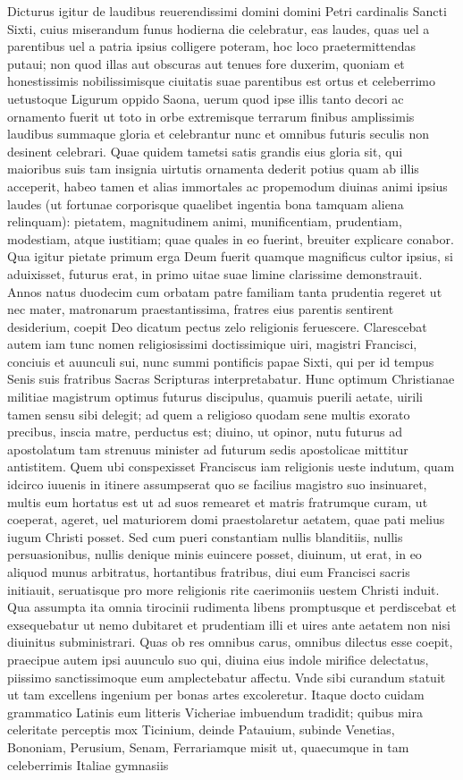 \documentclass[a5paper,twoside]{article}
\begin{document}
Dicturus igitur de laudibus reuerendissimi domini domini Petri cardinalis Sancti Sixti, cuius miserandum funus hodierna die celebratur, eas laudes, quas uel a parentibus uel a patria ipsius colligere poteram, hoc loco praetermittendas putaui; non quod illas aut obscuras aut tenues fore duxerim, quoniam et honestissimis nobilissimisque ciuitatis suae parentibus est ortus et celeberrimo uetustoque Ligurum oppido Saona, uerum quod ipse illis tanto decori ac ornamento fuerit ut toto in orbe extremisque terrarum finibus amplissimis laudibus summaque gloria et celebrantur nunc et omnibus futuris seculis non desinent celebrari. Quae quidem tametsi satis grandis eius gloria sit, qui maioribus suis tam insignia uirtutis ornamenta dederit potius quam ab illis acceperit, habeo tamen et alias immortales ac propemodum diuinas animi ipsius laudes (ut fortunae corporisque quaelibet ingentia bona tamquam aliena relinquam): pietatem, magnitudinem animi, munificentiam, prudentiam, modestiam, atque iustitiam; quae quales in eo fuerint, breuiter explicare conabor. Qua igitur pietate primum erga Deum fuerit quamque magnificus cultor ipsius, si aduixisset, futurus erat, in primo uitae suae limine clarissime demonstrauit. Annos natus duodecim cum orbatam patre familiam tanta prudentia regeret ut nec mater, matronarum praestantissima, fratres eius parentis sentirent desiderium, coepit Deo dicatum pectus zelo religionis feruescere. Clarescebat autem iam tunc nomen religiosissimi doctissimique uiri, magistri Francisci, conciuis et auunculi sui, nunc summi pontificis papae Sixti, qui per id tempus Senis suis fratribus Sacras Scripturas interpretabatur. Hunc optimum Christianae militiae magistrum optimus futurus discipulus, quamuis puerili aetate, uirili tamen sensu sibi delegit; ad quem a religioso quodam sene multis exorato precibus, inscia matre, perductus est; diuino, ut opinor, nutu futurus ad apostolatum tam strenuus minister ad futurum sedis apostolicae mittitur antistitem. Quem ubi conspexisset Franciscus iam religionis ueste indutum, quam idcirco iuuenis in itinere assumpserat quo se facilius magistro suo insinuaret, multis eum hortatus est ut ad suos remearet et matris fratrumque curam, ut coeperat, ageret, uel maturiorem domi praestolaretur aetatem, quae pati melius iugum Christi posset. Sed cum pueri constantiam nullis blanditiis, nullis persuasionibus, nullis denique minis euincere posset, diuinum, ut erat, in eo aliquod munus arbitratus, hortantibus fratribus, diui eum Francisci sacris initiauit, seruatisque pro more religionis rite caerimoniis uestem Christi induit. Qua assumpta ita omnia tirocinii rudimenta libens promptusque et perdiscebat et exsequebatur ut nemo dubitaret et prudentiam illi et uires ante aetatem non nisi diuinitus subministrari. Quas ob res omnibus carus, omnibus dilectus esse coepit, praecipue autem ipsi auunculo suo qui, diuina eius indole mirifice delectatus, piissimo sanctissimoque eum amplectebatur affectu. Vnde sibi curandum statuit ut tam excellens ingenium per bonas artes excoleretur. Itaque docto cuidam grammatico Latinis eum litteris Vicheriae imbuendum tradidit; quibus mira celeritate perceptis mox Ticinium, deinde Patauium, subinde Venetias, Bononiam, Perusium, Senam, Ferrariamque misit ut, quaecumque in tam celeberrimis Italiae gymnasiis 
\end{document}
